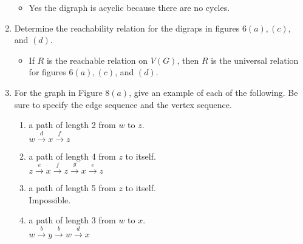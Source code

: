 \documentclass[11pt]{article}
\begin{document}
\begin{enumerate}
	\begin{itemize}
	\item Yes the digraph is acyclic because there are no cycles.
	\end{itemize}
\setcounter{enumi}{7}
\item Determine the reachability relation for the digraps in figures $6(a),(c)$, and $(d)$.
	\begin{itemize}
	\item If $R$ is the reachable relation on $V(G)$, then $R$ is the universal relation for figures $6(a),(c)$, and $(d)$.
	\end{itemize}
\setcounter{enumi}{15}
\item For the graph in Figure $8(a)$, give an example of each of the following. Be sure to specify the edge sequence 
and the vertex sequence.
	\begin{enumerate}
	\item a path of length 2 from $w$ to $z$.\\
	$w\xrightarrow{d} x\xrightarrow{f}z$
	\item a path of length 4 from $z$ to itself.\\
	$z\xrightarrow{e} x\xrightarrow{f} z\xrightarrow{g} x\xrightarrow{e}z$
	\item a path of length 5 from $z$ to itself.\\
	Impossible.
	\item a path of length 3 from $w$ to $x$.\\
	$w\xrightarrow{b} y\xrightarrow{b} w\xrightarrow{d} x$
	\end{enumerate}








\end{enumerate}
\end{document}
